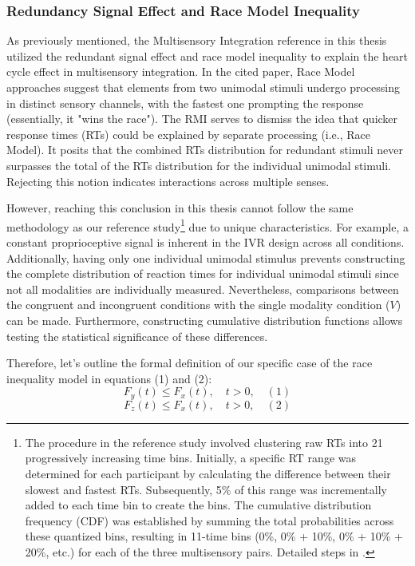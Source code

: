 \documentclass[12pt,oneside,openright]{report}
\begin{document}
\subsubsection*{Redundancy Signal Effect and Race Model Inequality}

As previously mentioned, the Multisensory Integration reference in this thesis utilized the redundant signal effect and race model inequality to explain the heart cycle effect in multisensory integration. In the cited paper, Race Model approaches suggest that elements from two unimodal stimuli undergo processing in distinct sensory channels, with the fastest one prompting the response (essentially, it "wins the race"). The RMI serves to dismiss the idea that quicker response times (RTs) could be explained by separate processing (i.e., Race Model). It posits that the combined RTs distribution for redundant stimuli never surpasses the total of the RTs distribution for the individual unimodal stimuli. Rejecting this notion indicates interactions across multiple senses.

However, reaching this conclusion in this thesis cannot follow the same methodology as our reference study\footnote{The procedure in the reference study involved clustering raw RTs into 21 progressively increasing time bins. Initially, a specific RT range was determined for each participant by calculating the difference between their slowest and fastest RTs. Subsequently, 5\% of this range was incrementally added to each time bin to create the bins. The cumulative distribution frequency (CDF) was established by summing the total probabilities across these quantized bins, resulting in 11-time bins (0\%, 0\% + 10\%, 0\% + 10\% + 20\%, etc.) for each of the three multisensory pairs. Detailed steps in \textcite{Mahoney2019-yq}.} due to unique characteristics. For example, a constant proprioceptive signal is inherent in the IVR design across all conditions. Additionally, having only one individual unimodal stimulus prevents constructing the complete distribution of reaction times for individual unimodal stimuli since not all modalities are individually measured. Nevertheless, comparisons between the congruent and incongruent conditions with the single modality condition ($V$) can be made. Furthermore, constructing cumulative distribution functions allows testing the statistical significance of these differences.

Therefore, let's outline the formal definition of our specific case of the race inequality model in equations (1) and (2):
\[
F_y(t) \leq F_x(t), \quad t > 0, \quad (1)
\]
\[
F_z(t) \leq F_x(t), \quad t > 0, \quad (2)
\]
\end{document}
